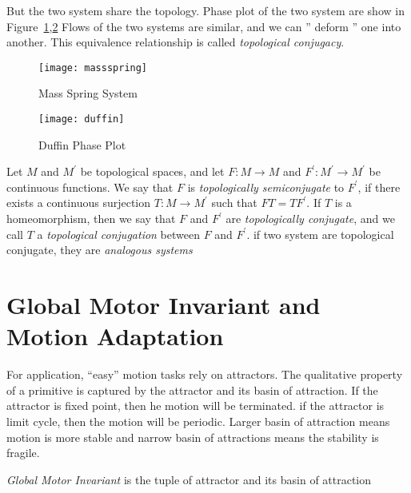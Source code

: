 But the two system share the topology. 
Phase plot of the two system are show in Figure~\ref{fig:msphaseplot},\ref{fig:duffin}
Flows of the two systems are similar, and we can '' deform '' one into another.
This equivalence relationship is called \emph{topological conjugacy}.

\begin{figure}
\begin{center}
\texttt{[image: massspring]}
\end{center}
\caption{Mass Spring System}
\label{fig:msphaseplot}
\end{figure}

\begin{figure}
\begin{center}
\texttt{[image: duffin]}
\end{center}
\caption{Duffin Phase Plot}
\label{fig:duffin}
\end{figure}



\begin{mydef}
Let $M$ and $M^{'}$ be topological spaces, and let $F\colon M\to M$ and $F^{'}\colon M^{'}\to M^{'}$
be continuous functions. We say that $F$ is
\emph{topologically semiconjugate} to $F^{'}$, if there exists a continuous
surjection $T\colon M\to M^{'}$ such that $FT=TF^{'}$. If $T$ is a homeomorphism,
then we say that $F$ and $F^{'}$ are \emph{topologically conjugate}, and we call
$T$ a \emph{topological conjugation} between $F$ and $F^{'}$.
if two system are topological conjugate, they are \emph{analogous systems}
\end{mydef}




\section{Global Motor Invariant and Motion Adaptation}

For \cms application, ``easy'' motion tasks rely on attractors.
The qualitative property of a primitive is captured by the attractor and its basin of attraction.
If the attractor is fixed point, then he motion will be terminated.
if the attractor is limit cycle, then the motion will be periodic.
Larger basin of attraction means motion is more stable and narrow basin of attractions means the stability is fragile.

\begin{mydef}
\emph{Global Motor Invariant} is the tuple of attractor and its basin of attraction
\end{mydef}


